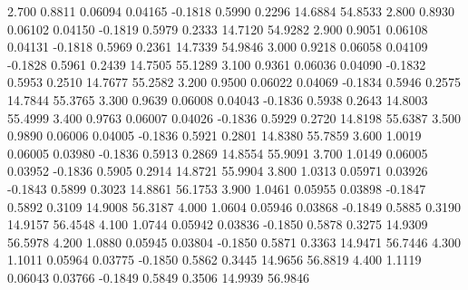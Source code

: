    2.700   0.8811   0.06094   0.04165  -0.1818   0.5990   0.2296  14.6884  54.8533
   2.800   0.8930   0.06102   0.04150  -0.1819   0.5979   0.2333  14.7120  54.9282
   2.900   0.9051   0.06108   0.04131  -0.1818   0.5969   0.2361  14.7339  54.9846
   3.000   0.9218   0.06058   0.04109  -0.1828   0.5961   0.2439  14.7505  55.1289
   3.100   0.9361   0.06036   0.04090  -0.1832   0.5953   0.2510  14.7677  55.2582
   3.200   0.9500   0.06022   0.04069  -0.1834   0.5946   0.2575  14.7844  55.3765
   3.300   0.9639   0.06008   0.04043  -0.1836   0.5938   0.2643  14.8003  55.4999
   3.400   0.9763   0.06007   0.04026  -0.1836   0.5929   0.2720  14.8198  55.6387
   3.500   0.9890   0.06006   0.04005  -0.1836   0.5921   0.2801  14.8380  55.7859
   3.600   1.0019   0.06005   0.03980  -0.1836   0.5913   0.2869  14.8554  55.9091
   3.700   1.0149   0.06005   0.03952  -0.1836   0.5905   0.2914  14.8721  55.9904
   3.800   1.0313   0.05971   0.03926  -0.1843   0.5899   0.3023  14.8861  56.1753
   3.900   1.0461   0.05955   0.03898  -0.1847   0.5892   0.3109  14.9008  56.3187
   4.000   1.0604   0.05946   0.03868  -0.1849   0.5885   0.3190  14.9157  56.4548
   4.100   1.0744   0.05942   0.03836  -0.1850   0.5878   0.3275  14.9309  56.5978
   4.200   1.0880   0.05945   0.03804  -0.1850   0.5871   0.3363  14.9471  56.7446
   4.300   1.1011   0.05964   0.03775  -0.1850   0.5862   0.3445  14.9656  56.8819
   4.400   1.1119   0.06043   0.03766  -0.1849   0.5849   0.3506  14.9939  56.9846
